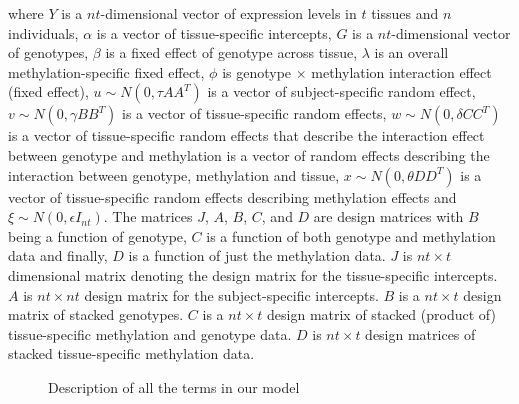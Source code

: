 \documentclass[hidelinks]{article}
\begin{document}
where $Y$ is a $nt$-dimensional vector of expression levels in $t$ tissues and $n$ individuals, $\alpha$ is a vector of tissue-specific intercepts, $G$ is a $nt$-dimensional vector of genotypes, $\beta$ is a fixed effect of genotype across tissue, $\lambda$ is an overall methylation-specific fixed effect, $\phi$ is genotype $\times$ methylation interaction effect (fixed effect), $u \sim N\left(0, \tau AA^T \right)$ is a vector of subject-specific random effect, $v \sim N\left(0,\gamma BB^T \right)$ is a vector of tissue-specific random effects, $w \sim N\left(0,\delta CC^T \right)$  is a vector of tissue-specific random effects that describe the interaction effect between genotype and methylation is a vector of random effects describing the interaction between genotype, methylation and tissue, $x \sim N\left(0,\theta DD^T \right)$ is a vector of tissue-specific random effects describing methylation effects and $\xi \sim N\left(0, \epsilon I_{nt} \right)$. The matrices $J$, $A$, $B$, $C$, and $D$ are design matrices with $B$ being a function of genotype, $C$ is a function of both genotype and methylation data and finally, $D$ is a function of just the methylation data. $J$ is $nt \times t$ dimensional matrix denoting the design matrix for the tissue-specific intercepts. $A$ is $nt \times nt$ design matrix for the subject-specific intercepts. $B$ is a $nt \times t$ design matrix of stacked genotypes. $C$ is a $nt \times t$ design matrix of stacked (product of) tissue-specific methylation and genotype data. $D$ is $nt \times t$ design matrices of stacked tissue-specific methylation data. 

\begin{figure}[H]
\centering
{}
\caption{Description of all the terms in our model}
\end{figure}
\end{document}
